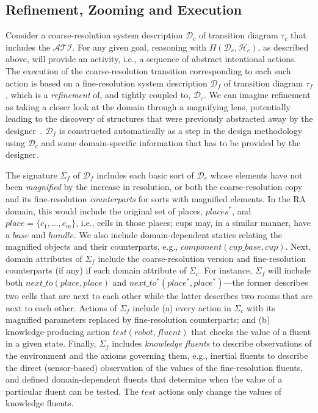 \documentclass[letterpaper, 10 pt, conference]{article}  %
\begin{document}
\subsection{Refinement, Zooming and Execution}
\label{sec:arch-refine-zoom}
Consider a coarse-resolution system description $\mathcal{D}_c$ of
transition diagram $\tau_c$ that includes the $\mathcal{ATI}$. For any
given goal, reasoning with $\Pi(\mathcal{D}_c, \mathcal{H}_c)$, as
described above, will provide an activity, i.e., a sequence of
abstract intentional actions. The execution of the coarse-resolution
transition corresponding to each such action is based on a
fine-resolution system description $\mathcal{D}_f$ of transition
diagram $\tau_f$, which is a \emph{refinement} of, and tightly coupled
to, $\mathcal{D}_c$. We can imagine refinement as taking a closer look
at the domain through a magnifying lens, potentially leading to the
discovery of structures that were previously abstracted away by the
designer~\cite{sridharan2017refinement}. $\mathcal{D}_f$ is
constructed automatically as a step in the design methodology using
$\mathcal{D}_c$ and some domain-specific information that has to be
provided by the designer.

The signature $\Sigma_f$ of $\mathcal{D}_f$ includes each basic sort
of $\mathcal{D}_c$ whose elements have not been \emph{magnified} by
the increase in resolution, or both the coarse-resolution copy and its
fine-resolution \emph{counterparts} for sorts with magnified elements.
In the RA domain, this would include the original set of places,
$places^*$, and $place=\{c_1,\dots,c_m\}$, i.e., cells in those
places; cups may, in a similar manner, have a $base$ and $handle$.  We
also include domain-dependent statics relating the magnified objects
and their counterparts, e.g., $component(cup\_base, cup)$.  Next,
domain attributes of $\Sigma_f$ include the coarse-resolution version
and fine-resolution counterparts (if any) if each domain attribute of
$\Sigma_c$. For instance, $\Sigma_f$ will include both
$next\_to(place, place)$ and $next\_to^*(place^*, place^*)$---the
former describes two cells that are next to each other while the
latter describes two rooms that are next to each other. Actions of
$\Sigma_f$ include (a) every action in $\Sigma_c$ with its magnified
parameters replaced by fine-resolution counterparts; and (b)
knowledge-producing action $test(robot, fluent)$ that checks the value
of a fluent in a given state.  Finally, $\Sigma_f$ includes
\emph{knowledge fluents} to describe observations of the environment
and the axioms governing them, e.g., inertial fluents to describe the
direct (sensor-based) observation of the values of the fine-resolution
fluents, and defined domain-dependent fluents that determine when the
value of a particular fluent can be tested. The $test$ actions only
change the values of knowledge fluents.
\end{document}
